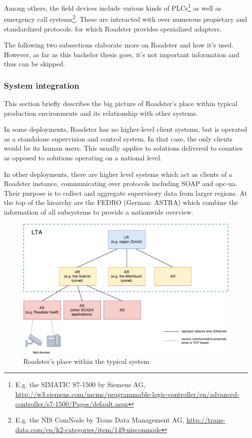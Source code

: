 Among others, the field devices include various kinds of \glspl{PLC}\footnote{E.g.
the SIMATIC S7-1500 by Siemens AG,
\url{http://w3.siemens.com/mcms/programmable-logic-controller/en/advanced-controller/s7-1500/Pages/default.aspx}}
as well as emergency call systems\footnote{E.g. the NIS ComNode by Trans Data
Management AG,
\url{http://trans-data.com/en/k2-categories/item/149-niscomnode}}.
These are interacted with over numerous propietary and standardized protocols,
for which Roadster provides spezialized adapters.

The following two subsections elaborate more on Roadster and how it's used.
However, as far as this bachelor thesis goes, it's not important information
and thus can be skipped.

\subsubsection{System integration}\label{sec:scope:sys-integration}
This section briefly describes the big picture of Roadster's place within
typical production environments and its relationship with other systems.

In some deployments, Roadster has no higher-level client systems, but is
operated as a standalone supervision and control system. In that case, the only
clients would be its human users. This usually applies to solutions delivered
to counties as opposed to solutions operating on a national level.

In other deployments, there are higher level systems which act as clients of a Roadster instance, communicating over
protocols including \gls{SOAP} and \gls{opc-ua}. Their purpose is to
collect and aggregate supervisory data from larger regions. At the top of the
hiearchy are the \gls{FEDRO} (German: \gls{ASTRA}) which combine the information of all
subsystems to provide a nationwide overview.

\begin{figure}[]
	\includegraphics[width=\textwidth]{img/overall_system.pdf}
	\caption{Roadster's place within the typical system}
	\label{fig:roadster:overallsys}
\end{figure}

